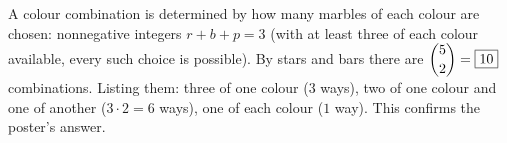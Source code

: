 A colour combination is determined by how many marbles of each colour are chosen: nonnegative integers $r+b+p=3$ (with at least three of each colour available, every such choice is possible). By stars and bars there are $\dbinom{5}{2}=\boxed{10}$ combinations. Listing them: three of one colour ($3$ ways), two of one colour and one of another ($3\cdot2=6$ ways), one of each colour ($1$ way). This confirms the poster's answer.
